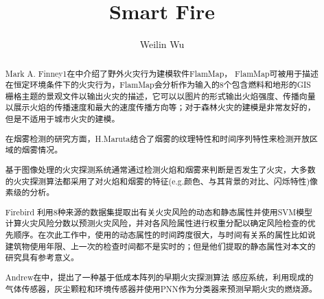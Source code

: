 \documentclass{ctexart}
\title{Smart Fire}
\author{Weilin Wu}
\begin{document}
\maketitle

\begin{abstract}
Mark A. Finney1在\cite{finney_overview_2006}中介绍了野外火灾行为建模软件FlamMap，
FlamMap可被用于描述在恒定环境条件下的火灾行为，FlamMap会分析作为输入的8个包含燃料和地形的GIS栅格主题的景观文件以输出火灾的描述，它可以以图片的形式输出火焰强度、传播向量以展示火焰的传播速度和最大的速度传播方向等；对于森林火灾的建模是非常友好的，但是不适用于城市火灾的建模。

在烟雾检测的研究方面，H.Maruta\cite{Hidenori_2009}结合了烟雾的纹理特性和时间序列特性来检测开放区域的烟雾情况。

 

基于图像处理的火灾探测系统通常通过检测火焰和烟雾来判断是否发生了火灾，大多数的火灾探测算法都采用了对火焰和烟雾的特征(e.g.颜色、与其背景的对比、闪烁特性)像素级的分析\cite{MillanAn}。

Firebird \cite{madaio_firebird:_2016}利用8种来源的数据集提取出有关火灾风险的动态和静态属性并使用SVM模型计算火灾风险分数以预测火灾风险，并对各风险属性进行权重分配以确定风险检查的优先顺序。在次此工作中，使用的动态属性的时间跨度很大，与时间有关系的属性比如说建筑物使用年限、上一次的检查时间都不是实时的；但是他们提取的静态属性对本文的研究具有参考意义。

Andrew在\cite{andrew_multi-stage_2016}中，提出了一种基于低成本阵列的早期火灾探测算法
感应系统，利用现成的气体传感器，灰尘颗粒和环境传感器并使用PNN作为分类器来预测早期火灾的燃烧源。

\end{abstract}

\section{}


\end{document}
